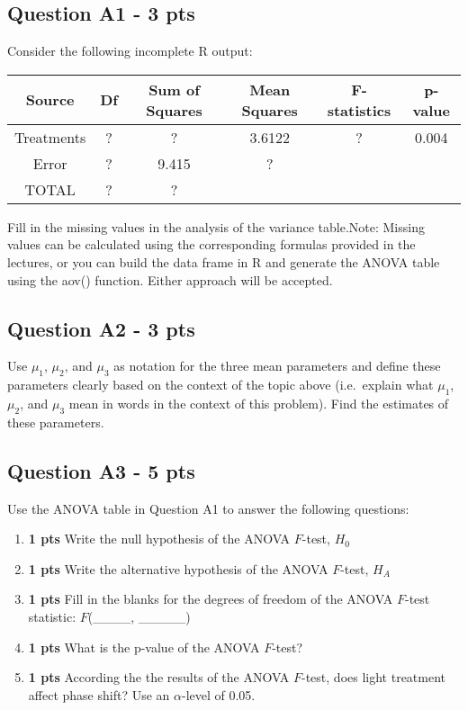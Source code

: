 \documentclass[
]{article}
\begin{document}
\hypertarget{question-a1---3-pts}{%
\subsection{Question A1 - 3 pts}\label{question-a1---3-pts}}

Consider the following incomplete R output:

\begin{longtable}[]{@{}cccccc@{}}
\toprule
Source & Df & Sum of Squares & Mean Squares & F-statistics & p-value \\
\midrule
\endhead
Treatments & ? & ? & 3.6122 & ? & 0.004 \\
Error & ? & 9.415 & ? & & \\
TOTAL & ? & ? & & & \\
\bottomrule
\end{longtable}

Fill in the missing values in the analysis of the variance table.Note:
Missing values can be calculated using the corresponding formulas
provided in the lectures, or you can build the data frame in R and
generate the ANOVA table using the aov() function. Either approach will
be accepted.

\hypertarget{question-a2---3-pts}{%
\subsection{Question A2 - 3 pts}\label{question-a2---3-pts}}

Use \(\mu_1\), \(\mu_2\), and \(\mu_3\) as notation for the three mean
parameters and define these parameters clearly based on the context of
the topic above (i.e.~explain what \(\mu_1\), \(\mu_2\), and \(\mu_3\)
mean in words in the context of this problem). Find the estimates of
these parameters.

\hypertarget{question-a3---5-pts}{%
\subsection{Question A3 - 5 pts}\label{question-a3---5-pts}}

Use the ANOVA table in Question A1 to answer the following questions:

\begin{enumerate}
\def\labelenumi{\alph{enumi}.}
\item
  \textbf{1 pts} Write the null hypothesis of the ANOVA \(F\)-test,
  \(H_0\)
\item
  \textbf{1 pts} Write the alternative hypothesis of the ANOVA
  \(F\)-test, \(H_A\)
\item
  \textbf{1 pts} Fill in the blanks for the degrees of freedom of the
  ANOVA \(F\)-test statistic: \(F\)(\_\_\_\_, \_\_\_\_\_)
\item
  \textbf{1 pts} What is the p-value of the ANOVA \(F\)-test?
\item
  \textbf{1 pts} According the the results of the ANOVA \(F\)-test, does
  light treatment affect phase shift? Use an \(\alpha\)-level of 0.05.
\end{enumerate}
\end{document}
